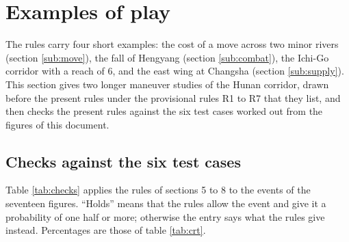 \documentclass[11pt]{article}
\begin{document}
\section{Examples of play}\label{sec:examples}\label{sec:maneuvers}
The rules carry four short examples: the cost of a move across two minor rivers (section \ref{sub:move}), the fall of Hengyang (section \ref{sub:combat}), the Ichi-Go corridor with a reach of 6, and the east wing at Changsha (section \ref{sub:supply}). This section gives two longer maneuver studies of the Hunan corridor, drawn before the present rules under the provisional rules R1 to R7 that they list, and then checks the present rules against the six test cases worked out from the figures of this document.



\subsection{Checks against the six test cases}\label{sub:checks}
Table \ref{tab:checks} applies the rules of sections 5 to 8 to the events of the seventeen figures. ``Holds'' means that the rules allow the event and give it a probability of one half or more; otherwise the entry says what the rules give instead. Percentages are those of table \ref{tab:crt}.
\end{document}
